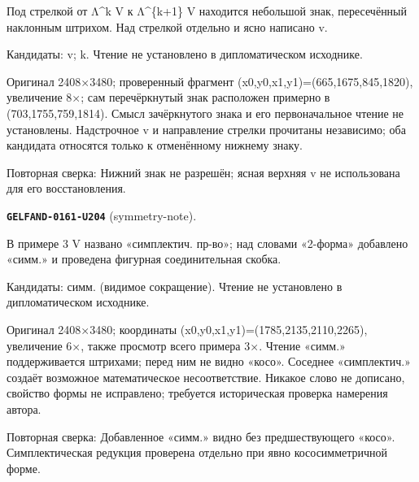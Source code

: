 Под стрелкой от Λ\textasciicircum{}k V к Λ\textasciicircum{}\{k+1\} V находится небольшой знак, пересечённый наклонным штрихом. Над стрелкой отдельно и ясно написано v.\par
Кандидаты: v; k. Чтение не установлено в дипломатическом исходнике.\par
Оригинал 2408×3480; проверенный фрагмент (x0,y0,x1,y1)=(665,1675,845,1820), увеличение 8×; сам перечёркнутый знак расположен примерно в (703,1755,759,1814). Смысл зачёркнутого знака и его первоначальное чтение не установлены. Надстрочное v и направление стрелки прочитаны независимо; оба кандидата относятся только к отменённому нижнему знаку.\par
Повторная сверка: Нижний знак не разрешён; ясная верхняя v не использована для его восстановления.\par\medskip
\par\noindent\leavevmode{}\label{GELFAND-0161-U204}\label{GELFAND-P001489:symmetry-note}\textbf{\texttt{GELFAND-0161-U204}} (symmetry-note).\nopagebreak[4]\par
В примере 3 V названо «симплектич. пр-во»; над словами «2-форма» добавлено «симм.» и проведена фигурная соединительная скобка.\par
Кандидаты: симм. (видимое сокращение). Чтение не установлено в дипломатическом исходнике.\par
Оригинал 2408×3480; координаты (x0,y0,x1,y1)=(1785,2135,2110,2265), увеличение 6×, также просмотр всего примера 3×. Чтение «симм.» поддерживается штрихами; перед ним не видно «косо». Соседнее «симплектич.» создаёт возможное математическое несоответствие. Никакое слово не дописано, свойство формы не исправлено; требуется историческая проверка намерения автора.\par
Повторная сверка: Добавленное «симм.» видно без предшествующего «косо». Симплектическая редукция проверена отдельно при явно кососимметричной форме.\par\medskip
